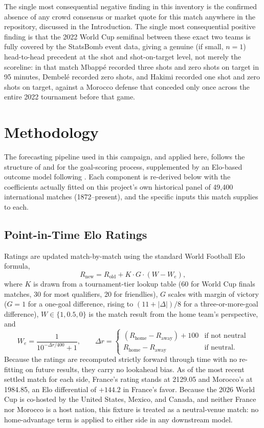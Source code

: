 \documentclass[11pt]{article}
\begin{document}
The single most consequential negative finding in this inventory is the confirmed absence
of any crowd consensus or market quote for this match anywhere in the repository, discussed
in the Introduction. The single most consequential positive finding is that the 2022
World Cup semifinal between these exact two teams is fully covered by the StatsBomb
event data, giving a genuine (if small, $n=1$) head-to-head precedent at the shot and
shot-on-target level, not merely the scoreline: in that match Mbapp\'e recorded three shots
and zero shots on target in 95 minutes, Dembel\'e recorded zero shots, and Hakimi recorded
one shot and zero shots on target, against a Morocco defense that conceded only once across
the entire 2022 tournament before that game.

\section{Methodology}
\label{sec:methods}

The forecasting pipeline used in this campaign, and applied here, follows the structure
of \citet{dixoncoles1997} and \citet{karlisntzoufras2003} for the goal-scoring process,
supplemented by an Elo-based outcome model following \citet{hvattum2010}. Each component
is re-derived below with the coefficients actually fitted on this project's own historical
panel of 49{,}400 international matches (1872--present), and the specific inputs this
match supplies to each.

\subsection{Point-in-Time Elo Ratings}

Ratings are updated match-by-match using the standard World Football Elo formula,
\[
R_{\text{new}} = R_{\text{old}} + K \cdot G \cdot (W - W_e),
\]
where $K$ is drawn from a tournament-tier lookup table (60 for World Cup finals matches,
30 for most qualifiers, 20 for friendlies), $G$ scales with margin of victory
($G=1$ for a one-goal difference, rising to $(11+|\Delta|)/8$ for a three-or-more-goal
difference), $W \in \{1, 0.5, 0\}$ is the match result from the home team's perspective,
and
\[
W_e = \frac{1}{10^{-\Delta r / 400} + 1}, \qquad
\Delta r = \begin{cases} (R_{\text{home}} - R_{\text{away}}) + 100 & \text{if not neutral} \\ R_{\text{home}} - R_{\text{away}} & \text{if neutral.} \end{cases}
\]
Because the ratings are recomputed strictly forward through time with no re-fitting on
future results, they carry no lookahead bias. As of the most recent settled match for each
side, France's rating stands at 2129.05 and Morocco's at 1984.85, an Elo differential of
$+144.2$ in France's favor. Because the 2026 World Cup is co-hosted by the United States,
Mexico, and Canada, and neither France nor Morocco is a host nation, this fixture is
treated as a neutral-venue match: no home-advantage term is applied to either side in any
downstream model.
\end{document}
